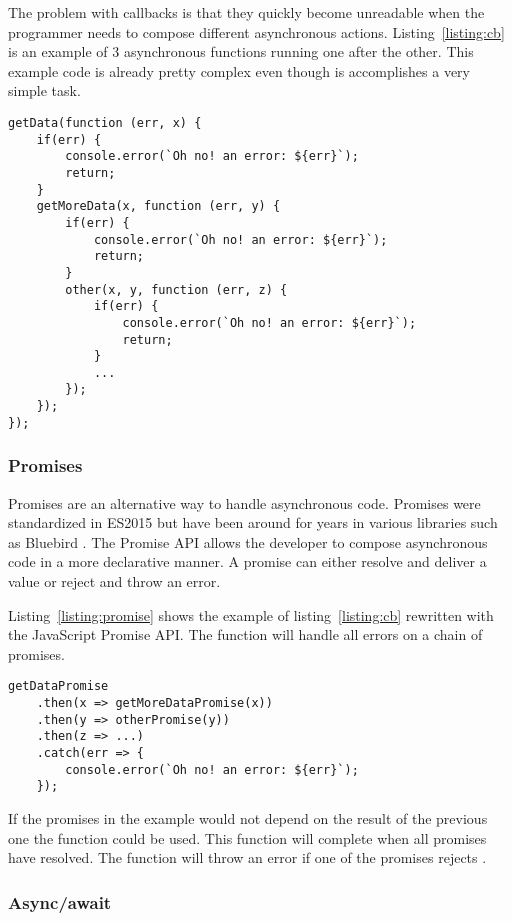 The problem with callbacks is that they quickly become unreadable when the programmer needs to compose different asynchronous actions. Listing~\ref{listing:cb} is an example of 3 asynchronous functions running one after the other. This example code is already pretty complex even though is accomplishes a very simple task.

\begin{lstlisting}[caption=Fetching data  with nested callbacks,label=listing:cb,float]
getData(function (err, x) {
	if(err) {
		console.error(`Oh no! an error: ${err}`);
		return;
	}
	getMoreData(x, function (err, y) {
		if(err) {
			console.error(`Oh no! an error: ${err}`);
			return;
		}
		other(x, y, function (err, z) {
			if(err) {
				console.error(`Oh no! an error: ${err}`);
				return;
			}
			...
		});
	});
});
\end{lstlisting}

\subsubsection{Promises}

Promises are an alternative way to handle asynchronous code. Promises were standardized in ES2015 but have been around for years in various libraries such as Bluebird \cite{promise}. The Promise API allows the developer to compose asynchronous code in a more declarative manner. A promise can either resolve and deliver a value or reject and throw an error.

Listing~\ref{listing:promise} shows the example of listing~\ref{listing:cb} rewritten with the JavaScript Promise API. The  function will handle all errors on a chain of promises.

\begin{lstlisting}[caption=Fetching data with the Promise API,label=listing:promise]
getDataPromise
	.then(x => getMoreDataPromise(x))
	.then(y => otherPromise(y))
	.then(z => ...)
	.catch(err => {
		console.error(`Oh no! an error: ${err}`);
	});
\end{lstlisting}

If the promises in the example would not depend on the result of the previous one the  function could be used. This function will complete when all promises have resolved. The  function will throw an error if one of the promises rejects \cite{prom-all}.

\subsubsection{Async/await}

